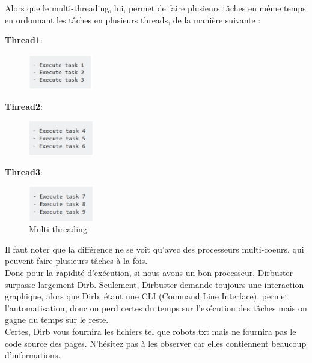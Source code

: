  Alors que le multi-threading, lui, permet de faire plusieurs tâches en même temps en ordonnant les tâches en plusieurs threads, de la manière suivante : 
\begin{center}
    \textbf{Thread1}:\\
       \begin{figure}[htp!]
  \centering
  \setlength\figureheight{7cm}
  \setlength\figurewidth{9cm}
  \includegraphics[width=0.25\textwidth]{oui/Ancien/imangeancien/dirb4.PNG}
  \label{fig:courbe-tikz}
\end{figure}
\textbf{Thread2}:\\
       \begin{figure}[htp!]
  \centering
  \setlength\figureheight{7cm}
  \setlength\figurewidth{9cm}
  \includegraphics[width=0.25\textwidth]{oui/Ancien/imangeancien/dirb5.PNG}
  \label{fig:courbe-tikz}
\end{figure}

\textbf{Thread3}:\\
       \begin{figure}[htp!]
  \centering
  \setlength\figureheight{7cm}
  \setlength\figurewidth{9cm}
  \includegraphics[width=0.25\textwidth]{oui/Ancien/imangeancien/dirb6.PNG}
  \caption{Multi-threading}
  \label{fig:courbe-tikz}
\end{figure}
\end{center}
Il faut noter que la différence ne se voit qu’avec des processeurs multi-coeurs, qui peuvent faire plusieurs tâches à la fois. \\
Donc pour la rapidité d’exécution, si nous avons un bon processeur, Dirbuster surpasse largement Dirb.
Seulement, Dirbuster demande toujours une interaction graphique, alors que Dirb, étant une CLI (Command Line Interface), permet l’automatisation, donc on perd certes du temps sur l’exécution des tâches mais on gagne du temps sur le reste.\\
Certes, Dirb vous fournira les fichiers tel que robots.txt mais ne fournira pas le code source des pages. N'hésitez pas à les observer car elles contiennent beaucoup d'informations. 